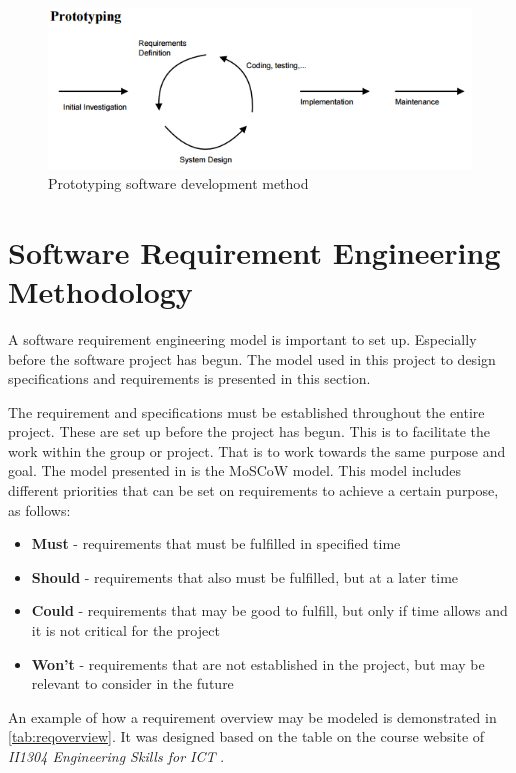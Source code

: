 \documentclass[a4paper,11pt]{kth-mag}
\begin{document}
\begin{figure}[h!]
    \centering
    \includegraphics[scale=0.8]{prototyping.png}
    \caption{Prototyping software development method \cite{rep:devmethod}}
    \label{fig:prototyping}
\end{figure}

\section{Software Requirement Engineering Methodology}
\label{sec:srem}
A software requirement engineering model is important to set up.
Especially before the software project has begun.
The model used in this project to design specifications and requirements is presented in this section.

The requirement and specifications must be established throughout the entire project.
These are set up before the project has begun.
This is to facilitate the work within the group or project.
That is to work towards the same purpose and goal.
The model presented in \cite{eklund2011arbeta} is the MoSCoW model.
This model includes different priorities that can be set on requirements to achieve a certain purpose, as follows:

\begin{itemize}
    \item \textbf{Must} - requirements that must be fulfilled in specified time
    \item \textbf{Should} - requirements that also must be fulfilled, but at a later time
    \item \textbf{Could} - requirements that may be good to fulfill, but only if time allows and it is not critical for the project
    \item \textbf{Won't} - requirements that are not established in the project, but may be relevant to consider in the future
\end{itemize}
\clearpage
An example of how a requirement overview may be modeled is demonstrated in \cref{tab:reqoverview}.
It was designed based on the table on the course website of \emph{II1304 Engineering Skills for ICT} \cite{web:requirementoverview}.
\end{document}
